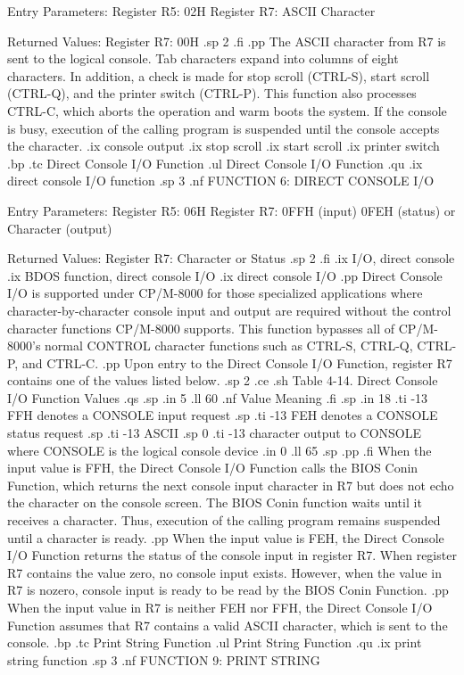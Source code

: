                Entry Parameters:
                  Register   R5:  02H
                  Register   R7:  ASCII Character

               Returned  Values:
                  Register   R7:  00H
.sp 2
.fi
.pp
The ASCII character from   R7 is sent to the logical console.
Tab characters expand into columns of eight characters.  In addition, a 
check is made for stop scroll (CTRL-S), start scroll (CTRL-Q), 
and the printer switch (CTRL-P). This function also processes
CTRL-C, which aborts the operation and warm boots the system.  If the console 
is busy, 
execution of the calling program is suspended until the console 
accepts the character.
.ix console output
.ix stop scroll
.ix start scroll
.ix printer switch
.bp
.tc                Direct Console I/O Function
.ul  
Direct Console I/O Function
.qu
.ix direct console I/O function
.sp 3
.nf
                 FUNCTION 6:  DIRECT CONSOLE I/O

             Entry Parameters: 
                Register   R5:  06H
                Register   R7:  0FFH (input)
                                0FEH (status)
                                     or
                                Character (output)

             Returned  Values:
                Register   R7:  Character or Status
.sp 2
.fi
.ix I/O, direct console
.ix BDOS function, direct console I/O
.ix direct console I/O
.pp
Direct Console I/O is supported under CP/M-8000 for those specialized
applications where character-by-character console input and output are
required without the control character functions CP/M-8000 supports.  This
function bypasses all of CP/M-8000's normal CONTROL character functions such
as CTRL-S, CTRL-Q, CTRL-P, and CTRL-C. 
.pp
Upon entry to the Direct Console I/O Function, register   R7
contains one of the values listed below. 
.sp 2
.ce
.sh
Table 4-14.  Direct Console I/O Function Values
.qs
.sp
.in 5
.ll 60
.nf
  Value                     Meaning
.fi
.sp
.in 18
.ti -13
FFH          denotes a CONSOLE input request
.sp
.ti -13
FEH          denotes a CONSOLE status request    
.sp
.ti -13
ASCII 
.sp 0
.ti -13
character    output to CONSOLE where CONSOLE is the logical console device
.in 0
.ll 65
.sp
.pp 
.fi
When the input value is FFH, the Direct Console I/O Function calls the BIOS
Conin Function, which returns the next console input character in   R7 but
does not echo the character on the console screen. The BIOS Conin function
waits until it receives a character. Thus, execution of the calling program
remains suspended until a character is ready. 
.pp
When the input value is FEH, the Direct Console I/O Function returns 
the status of the console input in register   R7. When register   R7 
contains the value zero, no console input exists.  However, when 
the value in   R7 is nozero, console input is ready to be read by 
the BIOS Conin Function.
.pp
When the input value in   R7 is neither FEH nor FFH, the Direct
Console I/O Function assumes that   R7 contains a valid ASCII
character, which is sent to the console. 
.bp
.tc                Print String Function
.ul
Print String Function
.qu
.ix print string function
.sp 3
.nf
                    FUNCTION 9:  PRINT STRING

